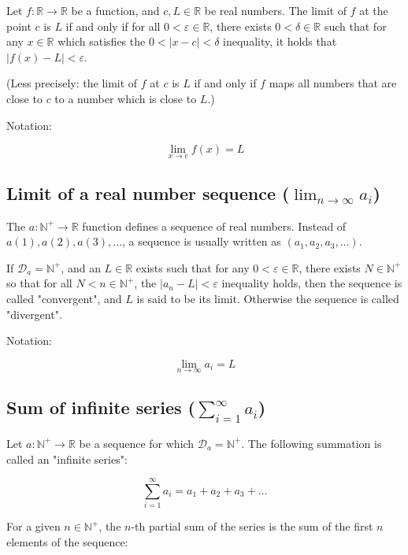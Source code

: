 \documentclass[titlepage]{article}
\begin{document}
        Let $f : \mathbb{R} \rightarrow \mathbb{R}$ be a function, and
        $c, L \in \mathbb{R}$ be real numbers. The limit of $f$ at the point
        $c$ is $L$ if and only if for all $0 < \varepsilon \in \mathbb{R}$,
        there exists $0 < \delta \in \mathbb{R}$ such that for any
        $x \in \mathbb{R}$ which satisfies the $0 < | x-c | < \delta$
        inequality, it holds that $| f(x) - L | < \varepsilon$.

        (Less precisely: the limit of $f$ at $c$ is $L$ if and only if $f$ maps
        all numbers that are close to $c$ to a number which is close to $L$.)

        Notation:

        $$\lim_{x \to c} f(x) = L$$

      \subsection{Limit of a real number sequence ($\lim_{n \to \infty} a_i$)}

        The $a : \mathbb{N}^+ \rightarrow \mathbb{R}$ function defines a
        sequence of real numbers. Instead of $a(1), a(2), a(3), \ldots$, a
        sequence is usually written as $(a_1, a_2, a_3, \ldots)$.

        If $\mathcal{D}_a = \mathbb{N}^+$, and an $L \in \mathbb{R}$ exists
        such that for any $0 < \varepsilon \in \mathbb{R}$, there exists
        $N \in \mathbb{N}^+$ so that for all $N < n \in \mathbb{N}^+$, the
        $|a_n - L| < \varepsilon$ inequality holds, then the sequence is called
        "convergent", and $L$ is said to be its limit. Otherwise the sequence is
        called "divergent".

        Notation:

        $$\lim_{n \to \infty} a_i = L$$

      \subsection{Sum of infinite series ($\sum_{i=1}^\infty a_i$)}

        Let $a : \mathbb{N}^+ \rightarrow \mathbb{R}$ be a sequence for which
        $\mathcal{D}_a = \mathbb{N}^+$. The following summation is called an
        "infinite series":

        $$\sum_{i=1}^\infty a_i = a_1 + a_2 + a_3 + \ldots$$

        For a given $n \in \mathbb{N}^+$, the $n$-th partial sum of the series
        is the sum of the first $n$ elements of the sequence:
\end{document}
